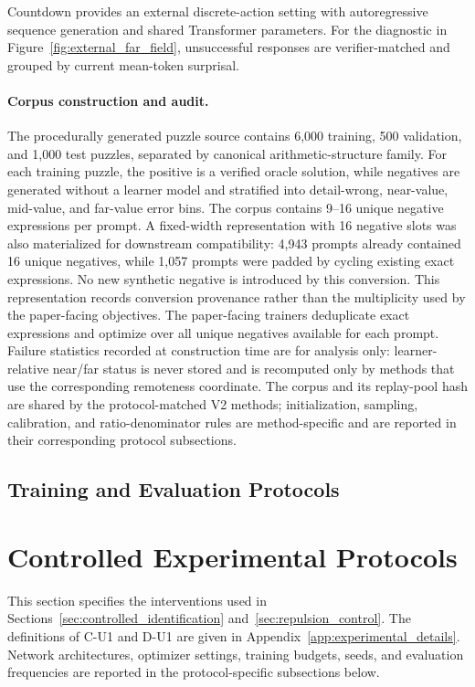 \documentclass{article}
\theoremstyle{plain}
\theoremstyle{definition}
\theoremstyle{remark}
\begin{document}
Countdown provides an external discrete-action setting with
autoregressive sequence generation and shared Transformer parameters.
For the diagnostic in Figure~\ref{fig:external_far_field}, unsuccessful
responses are verifier-matched and grouped by current mean-token surprisal.

\paragraph{Corpus construction and audit.}
The procedurally generated puzzle source contains 6{,}000 training,
500 validation, and 1{,}000 test puzzles, separated by canonical
arithmetic-structure family. For each training puzzle, the positive is
a verified oracle solution, while negatives are generated without a
learner model and stratified into detail-wrong, near-value,
mid-value, and far-value error bins. The corpus contains 9--16 unique
negative expressions per prompt. A fixed-width representation with
16 negative slots was also materialized for downstream compatibility:
4{,}943 prompts already contained 16 unique negatives, while 1{,}057
prompts were padded by cycling existing exact expressions. No new
synthetic negative is introduced by this conversion. This representation
records conversion provenance rather than the multiplicity used by the
paper-facing objectives. The paper-facing trainers deduplicate exact
expressions and optimize over all unique negatives available for each
prompt. Failure statistics recorded at construction time are for
analysis only: learner-relative near/far status is never stored and is
recomputed only by methods that use the corresponding remoteness
coordinate. The corpus and its replay-pool hash are shared by the
protocol-matched V2 methods; initialization, sampling, calibration,
and ratio-denominator rules are method-specific and are reported in
their corresponding protocol subsections.

\subsection{Training and Evaluation Protocols}

\section{Controlled Experimental Protocols}
\label{app:controlled_protocols}

This section specifies the interventions used in
Sections~\ref{sec:controlled_identification}
and~\ref{sec:repulsion_control}. The definitions of C-U1 and D-U1 are given in
Appendix~\ref{app:experimental_details}. Network architectures,
optimizer settings, training budgets, seeds, and evaluation frequencies
are reported in the protocol-specific subsections below.
\end{document}

